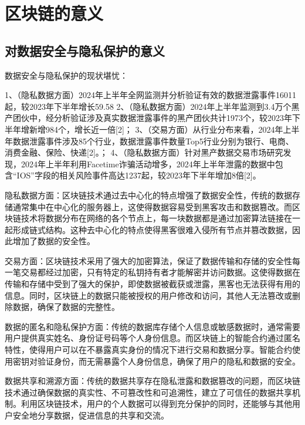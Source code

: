 
\chapter{区块链的意义}

\section{对数据安全与隐私保护的意义}

数据安全与隐私保护的现状堪忧：

1、（隐私数据方面）2024年上半年全网监测并分析验证有效的数据泄露事件16011起，较2023年下半年增长59.58%
2、（隐私数据方面）2024年上半年监测到3.4万个黑产团伙中，经分析验证涉及真实数据泄露事件的黑产团伙共计1973个，较2023年下半年增新增984个，增长近一倍[2]；
3、（交易方面）从行业分布来看，2024年上半年数据泄露事件涉及85个行业，数据泄露事件数量Top5行业分别为银行、电商、消费金融、保险、快递[2]。；
4、（隐私数据方面）针对黑产数据交易市场研究发现，2024年上半年利用Facetime诈骗活动增多，2024年上半年泄露的数据中包含“IOS”字段的相关风险事件高达1237起，较2023年下半年增加8倍[2]。

隐私数据方面：区块链技术通过去中心化的特点增强了数据安全性，传统的数据存储通常集中在中心化的服务器上，这使得数据容易受到黑客攻击和数据篡改。而区块链技术将数据分布在网络的各个节点上，每一块数据都是通过加密算法链接在一起形成链式结构。这种去中心化的特点使得黑客很难入侵所有节点并篡改数据，因此增加了数据的安全性。

交易方面：区块链技术采用了强大的加密算法，保证了数据传输和存储的安全性每一笔交易都经过加密，只有特定的私钥持有者才能解密并访问数据。这使得数据在传输和存储中受到了强大的保护，即使数据被截获或泄露，黑客也无法获得有用的信息。同时，区块链上的数据只能被授权的用户修改和访问，其他人无法篡改或删除数据，确保了数据的完整性。

数据的匿名和隐私保护方面：传统的数据库存储个人信息或敏感数据时，通常需要用户提供真实姓名、身份证号码等个人身份信息。而区块链上的智能合约通过匿名特性，使得用户可以在不暴露真实身份的情况下进行交易和数据分享。智能合约使用密钥对验证身份，而无需暴露个人身份信息，确保了用户的隐私和数据的安全。

数据共享和溯源方面：传统的数据共享存在隐私泄露和数据篡改的问题，而区块链技术通过确保数据的真实性、不可篡改性和可追溯性，建立了可信任的数据共享机制。利用区块链技术，用户的个人数据可以得到充分保护的同时，还能够与其他用户安全地分享数据，促进信息的共享和交流。



